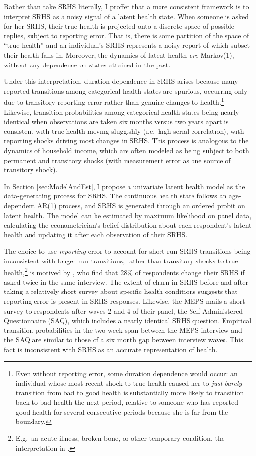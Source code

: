 \documentclass[12pt,pdftex,letterpaper]{article}
\begin{document}
Rather than take SRHS literally, I proffer that a more consistent framework is to interpret SRHS as a noisy signal of a latent health state.  When someone is asked for her SRHS, their true health is projected onto a discrete space of possible replies, subject to reporting error.  That is, there is some partition of the space of ``true health'' and an individual's SRHS represents a noisy report of which subset their health falls in. Moreover, the dynamics of latent health \textit{are} Markov(1), without any dependence on states attained in the past.

Under this interpretation, duration dependence in SRHS arises because many reported transitions among categorical health states are spurious, occurring only due to transitory reporting error rather than genuine changes to health.\footnote{Even without reporting error, some duration dependence would occur: an individual whose most recent shock to true health caused her to \textit{just barely} transition from bad to good health is substantially more likely to transition back to bad health the next period, relative to someone who has reported good health for several consecutive periods because she is far from the boundary.}  Likewise, transition probabilities among categorical health states being nearly identical when observations are taken six months versus two years apart is consistent with true health moving sluggishly (i.e.\ high serial correlation), with reporting shocks driving most changes in SRHS. This process is analogous to the dynamics of household income, which are often modeled as being subject to both permanent and transitory shocks (with measurement error as one source of transitory shock).

In Section \ref{sec:ModelAndEst},  I propose a univariate latent health model as the data-generating process for SRHS. The continuous health state follows an age-dependent AR(1) process, and SRHS is generated through an ordered probit on latent health.  The model can be estimated by maximum likelihood on panel data, calculating the econometrician's belief distribution about each respondent's latent health and updating it after each observation of their SRHS.

The choice to use \textit{reporting} error to account for short run SRHS transitions being inconsistent with longer run transitions, rather than transitory shocks to true health,\footnote{E.g.\ an acute illness, broken bone, or other temporary condition, the interpretation in \cite{Halliday11}.} is motived by \cite{Crossley02}, who find that 28\% of respondents change their SRHS if asked twice in the same interview.  The extent of churn in SRHS before and after taking a relatively short survey about specific health conditions suggests that reporting error is present in SRHS responses. Likewise, the MEPS mails a short survey to respondents after waves 2 and 4 of their panel, the Self-Administered Questionnaire (SAQ), which includes a nearly identical SRHS question. Empirical transition probabilities in the two week span between the MEPS interview and the SAQ are similar to those of a six month gap between interview waves. This fact is inconsistent with SRHS as an accurate representation of health.
\end{document}
